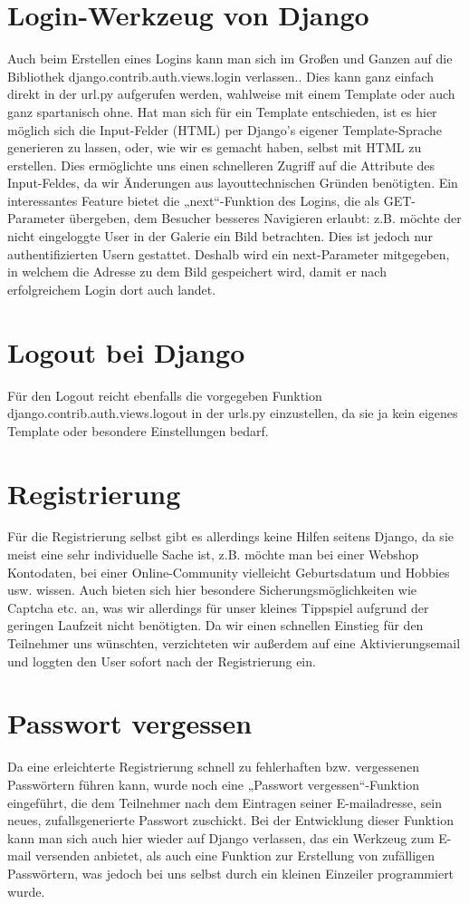 \section{Login-Werkzeug von Django}
Auch beim Erstellen eines Logins kann man sich im Großen und Ganzen auf die 
Bibliothek django.contrib.auth.views.login verlassen.. Dies kann ganz einfach 
direkt in der url.py aufgerufen werden, wahlweise mit einem Template oder auch 
ganz spartanisch ohne. Hat man sich für ein Template entschieden, ist es hier 
möglich sich die Input-Felder (HTML) per Django's eigener Template-Sprache 
generieren zu lassen, oder, wie wir es gemacht haben, selbst mit HTML zu 
erstellen. Dies ermöglichte uns einen schnelleren Zugriff auf die Attribute des
Input-Feldes, da wir Änderungen aus layouttechnischen Gründen benötigten. Ein 
interessantes Feature bietet die „next“-Funktion des Logins, die als 
GET-Parameter übergeben, dem Besucher besseres Navigieren erlaubt: z.B. möchte 
der nicht eingeloggte User in der Galerie ein Bild betrachten. Dies ist jedoch 
nur authentifizierten Usern gestattet. Deshalb wird ein next-Parameter 
mitgegeben, in welchem die Adresse zu dem Bild gespeichert wird, damit er nach 
erfolgreichem Login dort auch landet.


\section{Logout bei Django}
Für den Logout reicht ebenfalls die vorgegeben Funktion 
django.contrib.auth.views.logout in der urls.py einzustellen, da sie ja kein 
eigenes Template oder besondere Einstellungen bedarf.


\section{Registrierung}
Für die Registrierung selbst gibt es allerdings keine Hilfen seitens Django, da
sie meist eine sehr individuelle Sache ist, z.B. möchte man bei einer Webshop 
Kontodaten, bei einer Online-Community vielleicht Geburtsdatum und Hobbies usw.
wissen. Auch bieten sich hier besondere Sicherungsmöglichkeiten wie Captcha
etc.  an, was wir allerdings für unser kleines Tippspiel aufgrund der geringen 
Laufzeit nicht benötigten. Da wir einen schnellen Einstieg für den Teilnehmer 
uns wünschten, verzichteten wir außerdem auf eine Aktivierungsemail und loggten
den User sofort nach der Registrierung ein.

\section{Passwort vergessen}
Da eine erleichterte Registrierung schnell zu fehlerhaften bzw. vergessenen 
Passwörtern führen kann, wurde noch eine „Passwort vergessen“-Funktion 
eingeführt, die dem Teilnehmer nach dem Eintragen seiner E-mailadresse, sein 
neues, zufallsgenerierte Passwort zuschickt. Bei der Entwicklung dieser
Funktion  kann man sich auch hier wieder auf Django verlassen, das ein Werkzeug
zum E-mail versenden anbietet, als auch eine Funktion zur Erstellung von 
zufälligen Passwörtern, was jedoch bei uns selbst durch ein kleinen Einzeiler 
programmiert wurde.

